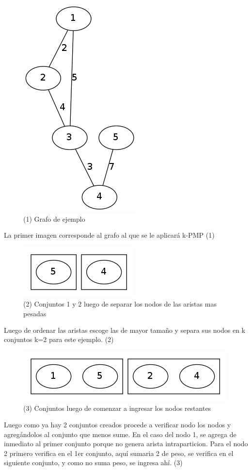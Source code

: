 \begin{figure}[H]
\begin{center}
\includegraphics[scale=0.4]{./img/greedy1.png}
\caption{(1) Grafo de ejemplo}
\end{center}
\end{figure}
La primer imagen corresponde al grafo al que se le aplicará k-PMP (1)

\begin{figure}[H]
\begin{center}
\includegraphics[scale=0.4]{./img/greedy2.png}
\caption{(2) Conjuntos 1 y 2 luego de separar los nodos de las aristas mas pesadas}
\end{center}
\end{figure}
Luego de ordenar las aristas escoge las de mayor tamaño y separa sus nodos en k conjuntos k=2 para este ejemplo. (2)

\begin{figure}[H]
\begin{center}
\includegraphics[scale=0.4]{./img/greedy3.png}
\caption{(3) Conjuntos luego de comenzar a ingresar los nodos restantes}
\end{center}
\end{figure}
Luego como ya hay 2 conjuntos creados procede a verificar nodo los nodos y agregándolos al conjunto que menos sume. En el caso del nodo 1, se agrega de inmediato al primer conjunto porque no genera arista intraparticion. Para el nodo 2 primero verifica en el 1er conjunto, aquí sumaria 2 de peso, se verifica en el siguiente conjunto, y como no suma peso, se ingresa ahí. (3)

